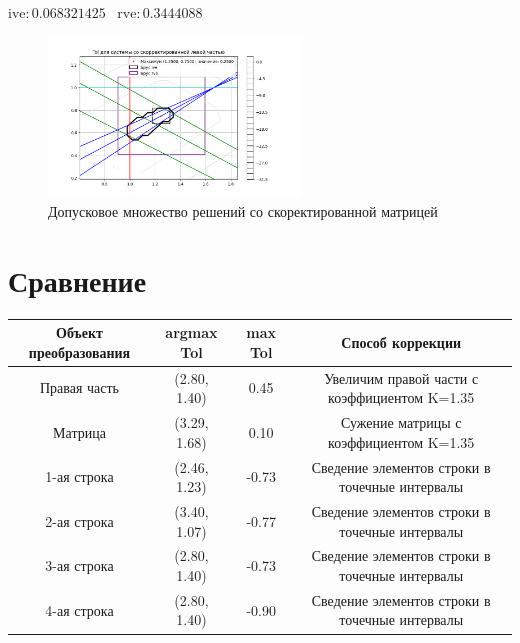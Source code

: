 \documentclass[a4paper,14pt]{article}
\begin{document}
	$\mathrm{ive}: 0.068321425 \;\;\;\mathrm{rve}: 0.3444088$
	\begin{figure}[H] \label{MatrixCorrSet}
		\centering
		\includegraphics[width=0.6\textwidth]{../src/pic/left_bliz.png}
		\caption{Допусковое множество решений со скоректированной матрицей} 
	\end{figure}
	
	\section{Сравнение}
	\begin{center}
		\begin{tabular}{|c|c|c|c|}
			\hline
			Объект преобразования & argmax Tol & max Tol & Способ коррекции \\ \hline\hline
			Правая часть & (2.80, 1.40) & 0.45 & Увеличим правой части с коэффициентом K=1.35 \\ \hline
			Матрица & (3.29, 1.68) & 0.10 & Сужение матрицы с коэффициентом K=1.35\\ \hline
			1-ая строка & (2.46, 1.23) & -0.73 & Сведение элементов строки в точечные интервалы \\ \hline
			2-ая строка & (3.40, 1.07) & -0.77 & Сведение элементов строки в точечные интервалы \\ \hline
			3-ая строка & (2.80, 1.40) & -0.73 & Сведение элементов строки в точечные интервалы \\ \hline
			4-ая строка & (2.80, 1.40) & -0.90 & Сведение элементов строки в точечные интервалы \\ \hline
		\end{tabular}
	\end{center}
	
\end{document}
